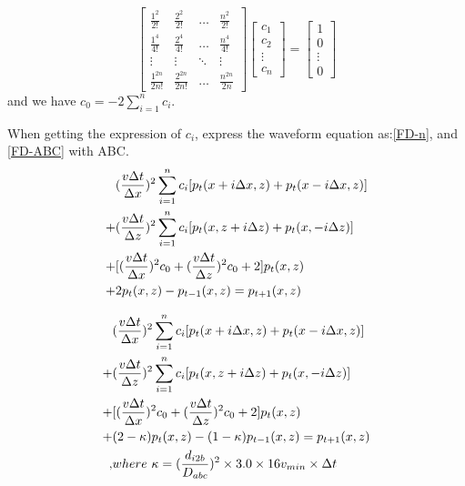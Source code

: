 \documentclass[a4paper]{article}
\begin{document}
		\begin{equation}
			\begin{bmatrix}
				\frac{1^2}{2!} & \frac{2^2}{2!} & \ldots & \frac{n^2}{2!}\\
				\frac{1^4}{4!} & \frac{2^4}{4!} & \ldots & \frac{n^4}{4!}\\
				\vdots & \vdots & \ddots & \vdots\\
				\frac{1^{2n}}{2n!} & \frac{2^{2n}}{2n!} & \ldots & \frac{n^{2n}}{2n}
			\end{bmatrix}
			\begin{bmatrix}
				 c_1\\c_2\\\vdots\\c_n
			\end{bmatrix}
			=
			\begin{bmatrix}
				 1\\0\\\vdots\\0
			\end{bmatrix}
			\label{n-order}
		\end{equation}
		 and we have $c_0=-2 \sum_{i=1}^{n}c_i$.

		When getting the expression of \textbf{$c_i$}, express the waveform equation as:\autoref{FD-n}, and \autoref{FD-ABC} with ABC.
		\begin{align}
			&(\frac{v\Delta t}{\Delta x})^2\sum_{i=1}^n c_i[p_t(x+i\Delta x,z)+p_t(x-i\Delta x, z)] \notag\\
			+&(\frac{v\Delta t}{\Delta z})^2\sum_{i=1}^n c_i[p_t(x, z+i\Delta z)+p_t(x, -i\Delta z)] \notag\\
			+&[(\frac{v\Delta t}{\Delta x})^2c_0+(\frac{v\Delta t}{\Delta z})^2c_0+2]p_t(x,z)\notag\\
			+&2p_t(x,z)-p_{t-1}(x,z)=p_{t+1}(x,z)
			\label{FD-n}
		\end{align}

		\begin{align}
			&(\frac{v\Delta t}{\Delta x})^2\sum_{i=1}^n c_i[p_t(x+i\Delta x,z)+p_t(x-i\Delta x, z)] \notag\\
			+&(\frac{v\Delta t}{\Delta z})^2\sum_{i=1}^n c_i[p_t(x, z+i\Delta z)+p_t(x, -i\Delta z)] \notag\\
			+&[(\frac{v\Delta t}{\Delta x})^2c_0+(\frac{v\Delta t}{\Delta z})^2c_0+2]p_t(x,z)\notag\\
			+&(2-\kappa)p_t(x,z)-(1-\kappa)p_{t-1}(x,z)=p_{t+1}(x,z) \notag\\
			,&where\ \kappa=(\frac{d_{i2b}}{D_{abc}})^2\times 3.0 \times  16 v_{min}\times \Delta t 
			\label{FD-ABC}			
		\end{align}
\end{document}
